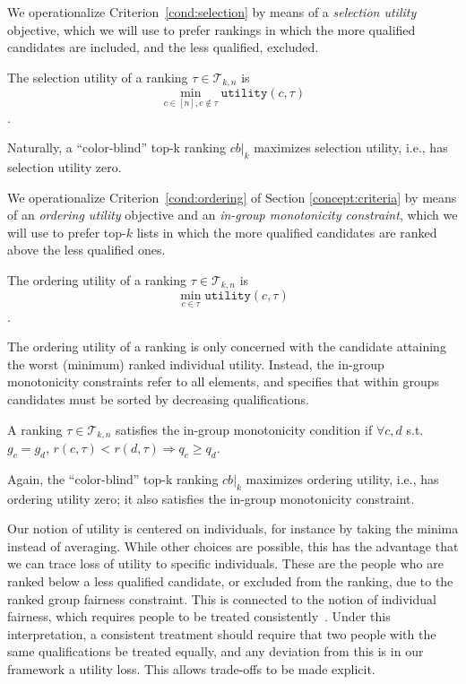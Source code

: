 %
We operationalize Criterion~\ref{cond:selection} by means of a \emph{selection utility} objective, which we will use to prefer rankings in which the more qualified candidates are included, and the less qualified, excluded.
%
\begin{definition}
	\label{def:selectionFairness}
	The selection utility of a ranking
	$\tau \in {\mathcal T}_{k,n}$ is \[\min_{c \in [n], c \notin \tau} \texttt{utility}(c,\tau)\].
\end{definition}
%
\noindent Naturally, a ``color-blind'' top-k ranking $\textit{cb}|_k$ maximizes selection utility, i.e., has selection utility zero.

%
We operationalize Criterion~\ref{cond:ordering} of Section \ref{concept:criteria} by means of an \emph{ordering utility} objective and an \emph{in-group monotonicity constraint}, which we will use to prefer top-$k$ lists in which the more qualified candidates are ranked above the less qualified ones.

\begin{definition}
	\label{def:orderingFairness}
	The ordering utility of a ranking $\tau \in {\mathcal T}_{k,n}$ is \[\min_{c \in \tau} \texttt{utility}(c,\tau)\].
\end{definition}

\noindent The ordering utility of a ranking is only concerned with the candidate attaining the worst (minimum) ranked individual utility. Instead, the in-group monotonicity constraints refer to all elements, and specifies that within groups candidates must be sorted by decreasing qualifications.

\begin{definition}
	\label{def:inGroupMonotonicity}
	A ranking $\tau \in {\mathcal T}_{k,n}$ satisfies the in-group monotonicity condition if $\forall c,d$ s.t. $g_c = g_d$, $r(c,\tau) < r(d,\tau) \Rightarrow q_c \ge q_d$.
\end{definition}

\noindent Again, the ``color-blind'' top-k ranking $\textit{cb}|_k$ maximizes ordering utility, i.e., has ordering utility zero; it also satisfies the in-group monotonicity constraint.

\label{concept:our-utility-individual-fairness}
%
Our notion of utility is centered on individuals, for instance by taking the minima instead of averaging.
%
While other choices are possible, this has the advantage that we can trace loss of utility to specific individuals. These are the people who are ranked below a less qualified candidate, or excluded from the ranking, due to the ranked group fairness constraint.
%
This is connected to the notion of individual fairness, which requires people to be treated consistently~\cite{Dwork2012}. Under this interpretation, a consistent treatment should require that two people with the same qualifications be treated equally, and any deviation from this is in our framework a utility loss. This allows trade-offs to be made explicit.

